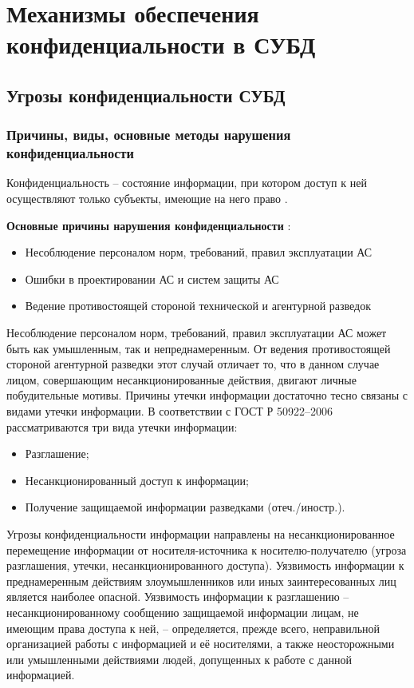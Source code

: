 \section{Механизмы обеспечения конфиденциальности в СУБД}
\subsection{Угрозы конфиденциальности СУБД}

\subsubsection{Причины, виды, основные методы нарушения конфиденциальности}

Конфиденциальность – состояние информации, при котором доступ к ней осуществляют только субъекты,
имеющие на него право \cite{crypto-methods} .

\textbf {Основные причины нарушения конфиденциальности} \cite{o-salo}:
\begin{itemize}
    \item Несоблюдение персоналом норм, требований, правил эксплуатации АС
    \item Ошибки в проектировании АС и систем защиты АС
    \item Ведение противостоящей стороной технической и агентурной разведок
\end{itemize}

Несоблюдение персоналом норм, требований, правил эксплуатации АС может быть как умышленным, так и непреднамеренным. От ведения противостоящей стороной аген­турной разведки этот случай отличает то, что в данном случае лицом, совершающим не­санкционированные действия, двигают личные побудительные мотивы. Причины утечки информации достаточно тесно связаны с видами утечки информации. В соответствии с ГОСТ Р 50922–2006 \cite{GOST50922} рассматриваются три вида утечки информации:

\begin{itemize}
    \item Разглашение;
    \item Несанкционированный доступ к информации;
    \item Получение защищаемой информации разведками (отеч./иностр.).
\end{itemize}

Угрозы конфиденциальности информации направлены на несанкционированное перемещение информации от
носителя-источника к носителю-получателю (угроза разглашения, утечки, несанкционированного доступа).
Уязвимость информации к преднамеренным действиям злоумышленников или иных заинтересованных лиц является
наиболее опасной.
Уязвимость информации к разглашению – несанкционированному сообщению защищаемой информации лицам, не имеющим
права доступа к ней, – определяется, прежде всего, неправильной организацией работы с информацией и её
носителями, а также неосторожными или умышленными действиями людей, допущенных к работе с данной информацией.

